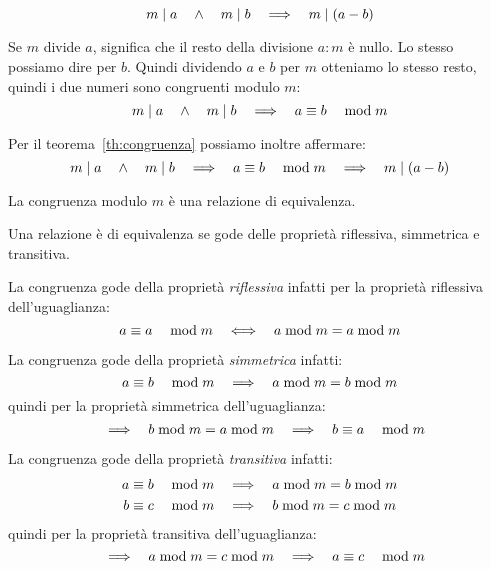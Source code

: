 \begin{teorema}
    \label{th:divisore_della_differenza}
    \begin{equation*}
        m  \mid  a \quad\land\quad m  \mid  b  \quad\Longrightarrow\quad  m  \mid  (a - b)
    \end{equation*}


    Se $m$ divide $a$, significa che il resto della divisione $a : m$ è nullo.
    Lo stesso possiamo dire per $b$.
    Quindi dividendo $a$ e $b$ per $m$ otteniamo lo stesso resto, quindi i due numeri sono congruenti modulo $m$:
    \begin{equation*}
        m  \mid  a \quad\land\quad m  \mid  b  \quad\Longrightarrow\quad   a \equiv b \quad\bmod m 
    \end{equation*}

    Per il teorema~\ref{th:congruenza} possiamo inoltre affermare:
    \begin{equation*}
        m  \mid  a \quad\land\quad m  \mid  b  \quad\Longrightarrow\quad   a \equiv b \quad\bmod m   \quad\Longrightarrow\quad  m  \mid  (a-b)
    \end{equation*}
\end{teorema}

\begin{teorema}
    La congruenza modulo $m$ è una relazione di equivalenza.


    Una relazione è di equivalenza se gode delle proprietà riflessiva, simmetrica e transitiva.

    La congruenza gode della proprietà \emph{riflessiva} infatti per la proprietà riflessiva dell'uguaglianza:
    \begin{equation*}
         a \equiv a \quad\bmod m   \quad\Longleftrightarrow\quad  a  \bmod  m = a  \bmod  m
    \end{equation*}

    La congruenza gode della proprietà \emph{simmetrica} infatti:
    \begin{equation*}
         a \equiv b \quad\bmod m   \quad\Longrightarrow\quad  a  \bmod  m = b  \bmod  m
    \end{equation*}
    quindi per la proprietà simmetrica dell'uguaglianza:
    \begin{equation*}
         \quad\Longrightarrow\quad  b  \bmod  m = a  \bmod  m  \quad\Longrightarrow\quad   b \equiv a \quad\bmod m 
    \end{equation*}

    La congruenza gode della proprietà \emph{transitiva} infatti:
    \begin{gather*}
         a \equiv b \quad\bmod m   \quad\Longrightarrow\quad  a  \bmod  m = b  \bmod  m \\
         b \equiv c \quad\bmod m   \quad\Longrightarrow\quad  b  \bmod  m = c  \bmod  m
    \end{gather*}
    quindi per la proprietà transitiva dell'uguaglianza:
    \begin{equation*}
         \quad\Longrightarrow\quad  a  \bmod  m = c  \bmod  m  \quad\Longrightarrow\quad   a \equiv c \quad\bmod m 
    \end{equation*}
\end{teorema}

